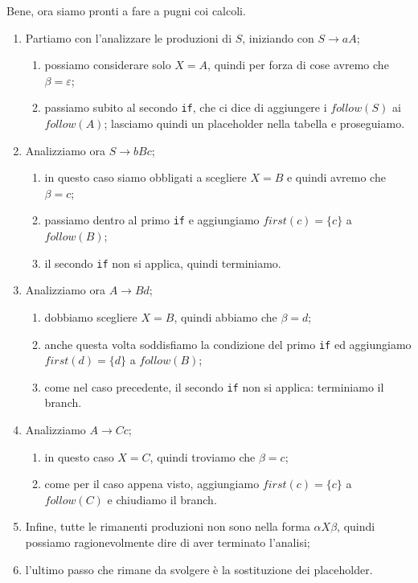 \documentclass[class=book, crop=false, oneside, 12pt]{standalone}
\begin{document}
\noindent Bene, ora siamo pronti a fare a pugni coi calcoli.

\begin{enumerate}
    \item Partiamo con l’analizzare le produzioni di \(S\), iniziando con \(S \to aA\);
    \begin{enumerate}
        \item possiamo considerare solo \(X = A\), quindi per forza di cose avremo che \(\beta = \varepsilon\);
        \item passiamo subito al secondo \texttt{if}, che ci dice di aggiungere i \(follow(S)\) ai \(follow(A)\); lasciamo quindi un placeholder nella tabella e proseguiamo.
    \end{enumerate}
    \item Analizziamo ora \(S \to bBc\);
    \begin{enumerate}
        \item in questo caso siamo obbligati a scegliere \(X = B\) e quindi avremo che \(\beta = c\);
        \item passiamo dentro al primo \texttt{if} e aggiungiamo \(first(c) = \{c\}\) a \(follow(B)\);
        \item il secondo \texttt{if} non si applica, quindi terminiamo.
    \end{enumerate}
    \item Analizziamo ora \(A \to Bd\);
    \begin{enumerate}
        \item dobbiamo scegliere \(X = B\), quindi abbiamo che \(\beta = d\);
        \item anche questa volta soddisfiamo la condizione del primo \texttt{if} ed aggiungiamo \(first(d)= \{d\}\) a \(follow(B)\);
        \item come nel caso precedente, il secondo \texttt{if} non si applica: terminiamo il branch.
    \end{enumerate}
    \item Analizziamo \(A \to Cc\);
    \begin{enumerate}
        \item in questo caso \(X = C\), quindi troviamo che \(\beta = c\);
        \item come per il caso appena visto, aggiungiamo \(first(c)=\{c\}\) a \(follow(C)\) e chiudiamo il branch.
    \end{enumerate}
    \item Infine, tutte le rimanenti produzioni non sono nella forma \(\alpha X \beta\), quindi possiamo ragionevolmente dire di aver terminato l’analisi;
    \item l'ultimo passo che rimane da svolgere è la sostituzione dei placeholder.
\end{enumerate}
\end{document}
